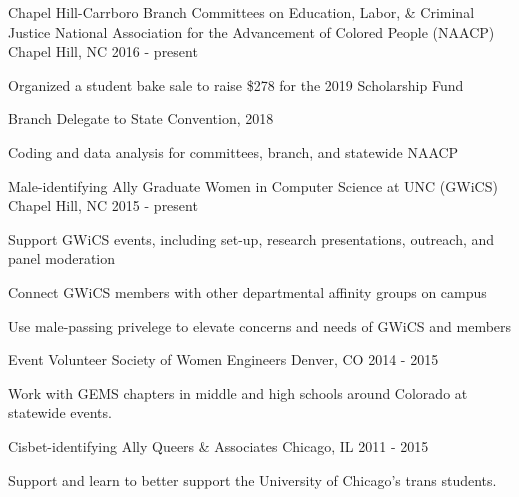 
\begin{cventries}
  \cventry
    {Chapel Hill-Carrboro Branch Committees on Education, Labor, \& Criminal Justice} %
    {National Association for the Advancement of Colored People (NAACP)} %
    {Chapel Hill, NC} %
    {2016 - present} %
    {
      \begin{cvitems} %
        \item {Organized a student bake sale to raise \$278 for the 2019 Scholarship Fund}
        \item {Branch Delegate to State Convention, 2018}
        \item {Coding and data analysis for committees, branch, and statewide NAACP}
      \end{cvitems}
    }
   
  \cventry
    {Male-identifying Ally} %
    {Graduate Women in Computer Science at UNC (GWiCS)} %
    {Chapel Hill, NC} %
    {2015 - present} %
    {
      \begin{cvitems} %
        \item {Support GWiCS events, including set-up, research presentations, outreach, and panel moderation}
        \item {Connect GWiCS members with other departmental affinity groups on campus}
        \item {Use male-passing privelege to elevate concerns and needs of GWiCS and members}
      \end{cvitems}
    }
	
  \cventry
    {Event Volunteer}
	{Society of Women Engineers}
	{Denver, CO}
	{2014 - 2015}
    {
      \begin{cvitems} %
        \item {Work with GEMS chapters in middle and high schools around Colorado at statewide events.}
      \end{cvitems}
    }
	
  \cventry
    {Cisbet-identifying Ally} %
    {Queers \& Associates} %
    {Chicago, IL} %
    {2011 - 2015} %
    {
      \begin{cvitems} %
        \item {Support and learn to better support the University of Chicago's trans students.}
      \end{cvitems}
    }

\end{cventries}
